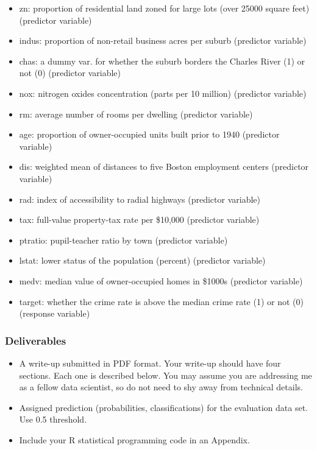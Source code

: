 \documentclass[
]{article}
\providecommand{\tightlist}{%
  \setlength{\itemsep}{0pt}\setlength{\parskip}{0pt}}
\begin{document}
\begin{itemize}
\tightlist
\item
  zn: proportion of residential land zoned for large lots (over 25000
  square feet) (predictor variable)
\item
  indus: proportion of non-retail business acres per suburb (predictor
  variable)
\item
  chas: a dummy var. for whether the suburb borders the Charles River
  (1) or not (0) (predictor variable)
\item
  nox: nitrogen oxides concentration (parts per 10 million) (predictor
  variable)
\item
  rm: average number of rooms per dwelling (predictor variable)
\item
  age: proportion of owner-occupied units built prior to 1940 (predictor
  variable)
\item
  dis: weighted mean of distances to five Boston employment centers
  (predictor variable)
\item
  rad: index of accessibility to radial highways (predictor variable)
\item
  tax: full-value property-tax rate per \$10,000 (predictor variable)
\item
  ptratio: pupil-teacher ratio by town (predictor variable)
\item
  lstat: lower status of the population (percent) (predictor variable)
\item
  medv: median value of owner-occupied homes in \$1000s (predictor
  variable)
\item
  target: whether the crime rate is above the median crime rate (1) or
  not (0) (response variable)
\end{itemize}

\hypertarget{deliverables}{%
\subsubsection{Deliverables}\label{deliverables}}

\begin{itemize}
\tightlist
\item
  A write-up submitted in PDF format. Your write-up should have four
  sections. Each one is described below. You may assume you are
  addressing me as a fellow data scientist, so do not need to shy away
  from technical details.
\item
  Assigned prediction (probabilities, classifications) for the
  evaluation data set. Use 0.5 threshold.
\item
  Include your R statistical programming code in an Appendix.
\end{itemize}
\end{document}
